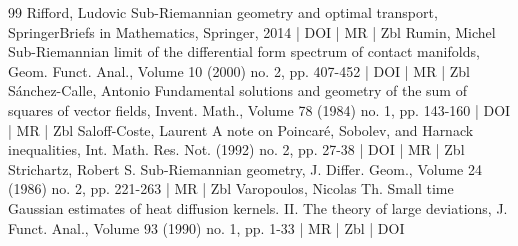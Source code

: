 \documentclass[10pt]{amsart}
\theoremstyle{definition}\newtheorem{defi}[theo]{Definition}\newtheorem{rema}[theo]{Remark}\newtheorem{exam}[theo]{Example}\newtheorem{exem}[theo]{Example}\newtheorem{nota}[theo]{Notation}
\begin{document}
\begin{thebibliography}{99}
Rifford, Ludovic Sub-Riemannian geometry and optimal transport, SpringerBriefs in Mathematics, Springer, 2014 | DOI | MR | Zbl
Rumin, Michel Sub-Riemannian limit of the differential form spectrum of contact manifolds, Geom. Funct. Anal., Volume 10 (2000) no. 2, pp. 407-452 | DOI | MR | Zbl
Sánchez-Calle, Antonio Fundamental solutions and geometry of the sum of squares of vector fields, Invent. Math., Volume 78 (1984) no. 1, pp. 143-160 | DOI | MR | Zbl
Saloff-Coste, Laurent A note on Poincaré, Sobolev, and Harnack inequalities, Int. Math. Res. Not. (1992) no. 2, pp. 27-38 | DOI | MR | Zbl
Strichartz, Robert S. Sub-Riemannian geometry, J. Differ. Geom., Volume 24 (1986) no. 2, pp. 221-263 | MR | Zbl
Varopoulos, Nicolas Th. Small time Gaussian estimates of heat diffusion kernels. II. The theory of large deviations, J. Funct. Anal., Volume 93 (1990) no. 1, pp. 1-33 | MR | Zbl | DOI
\end{thebibliography}
\end{document}
